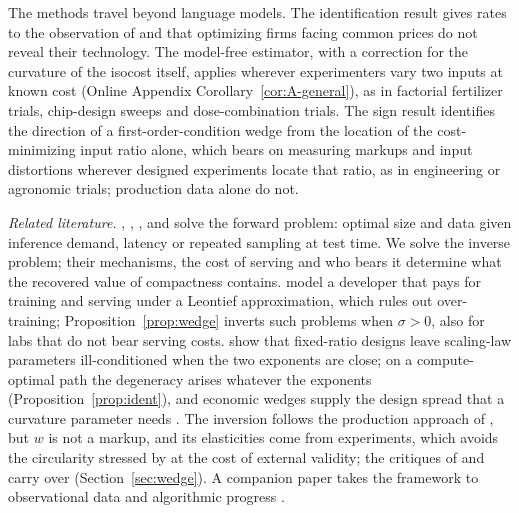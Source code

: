 The methods travel beyond language models. The identification result gives rates to the observation of
\citet{marschak1944random} and \citet{bond2005adjustment} that optimizing firms facing common prices do not reveal
their technology. The model-free estimator, with a correction for the curvature of the isocost itself, applies
wherever experimenters vary two inputs at known cost (Online Appendix Corollary~\ref{cor:A-general}), as in factorial
fertilizer trials, chip-design sweeps and dose-combination trials. The sign result identifies the direction of a
first-order-condition wedge from the location of the cost-minimizing input ratio alone, which bears on measuring
markups and input distortions \citep{deloecker2012markups, raval2023testing} wherever designed experiments locate that
ratio, as in engineering or agronomic trials; production data alone do not.

\textit{Related literature.} \citet{villalobos2023trading}, \citet{erdil2024optimally}, \citet{sardana2024beyond},
\citet{bian2025scaling} and \citet{roberts2026test} solve the forward problem: optimal size and data given inference
demand, latency or repeated sampling at test time. We solve the inverse problem; their mechanisms, the cost of serving
\citep{erdil2025inference} and who bears it determine what the recovered value of compactness contains.
\citet{hao2026theory} model a developer that pays for training and serving under a Leontief approximation, which rules
out over-training; Proposition~\ref{prop:wedge} inverts such problems when $\sigma>0$, also for labs that do not bear
serving costs. \citet{kricheli2026tokens} show that fixed-ratio designs leave scaling-law parameters ill-conditioned
when the two exponents are close; on a compute-optimal path the degeneracy arises whatever the exponents
(Proposition~\ref{prop:ident}), and economic wedges supply the design spread that a curvature parameter needs
\citep[][see also \citealp{ackerberg2015identification, gandhi2020identification}]{kiefer1959optimum,box1959design}.
The inversion follows the production approach of \citet{deloecker2012markups}, but $w$ is not a markup, and its
elasticities come from experiments, which avoids the circularity stressed by \citet{doraszelski2021reexamining} at the
cost of external validity; the critiques of \citet{bond2020unpleasant} and \citet{raval2023testing} carry over
(Section~\ref{sec:wedge}). A companion paper \citep{okar2026observational} takes the framework to observational data
and algorithmic progress \citep{mertens2026secret, whitfill2025note}.
